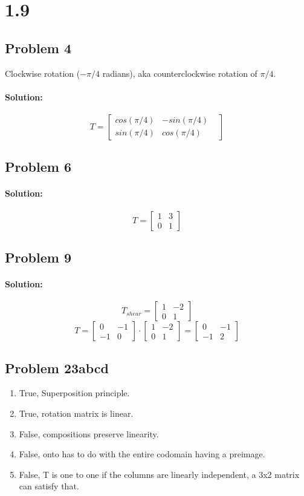 \documentclass[11pt, notitlepage]{article}
\newenvironment{solution}{\paragraph{Solution:}}{\hfill}
\begin{document}
\newpage
\section{1.9} 
\subsection{Problem 4}
Clockwise rotation ($-\pi/4$ radians), aka counterclockwise rotation of $\pi/4$.
\begin{solution}
	\[T=\begin{bmatrix}
		cos(\pi/4)&-sin(\pi/4)&\\
		sin(\pi/4)& cos(\pi/4)
	\end{bmatrix}
	\]
\end{solution}
\subsection{Problem 6}
\begin{solution}
	\[T=\begin{bmatrix}
	1&3\\
	0&1
	\end{bmatrix}
	\]
\end{solution}
\subsection{Problem 9}
\begin{solution}
	\[T_{shear}=\begin{bmatrix}
	1&-2\\
	0&1
	\end{bmatrix}
	\]
	\[T=\begin{bmatrix}
	0&-1\\
	-1&0
	\end{bmatrix}
	\cdot \begin{bmatrix}
	1&-2\\
	0&1
	\end{bmatrix}=\begin{bmatrix}
	0&-1\\
	-1&2
	\end{bmatrix}
	\]
\end{solution}
\subsection{Problem 23abcd}
	\begin{enumerate}[label=\alph*.)]
		\item True, Superposition principle.
		\item True, rotation matrix is linear.
		\item False, compositions preserve linearity.
		\item False, onto has to do with the entire codomain having a preimage.
		\item False, T is one to one if the columns are linearly independent, a 3x2 matrix can satisfy that.  
	\end{enumerate}
\end{document}
